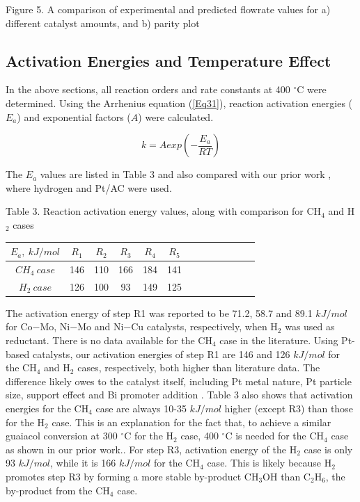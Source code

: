 \documentclass[journal=iecred,manuscript=article]{achemso}
\begin{document}
\begin{center}
\epsfxsize=500pt

Figure 5. A comparison of experimental and predicted flowrate values for a) different catalyst amounts, and b) parity plot
\end{center}

\subsection{Activation Energies and Temperature Effect}
In the above sections, all reaction orders and rate constants at 400 $^{\circ}$C were determined.
Using the Arrhenius equation (\ref{Eq31}), reaction activation energies ($E_a$) and exponential factors ($A$) were calculated.

\begin{equation} \label{Eq31}
k=Aexp\left(-\frac{E_a}{RT}\right)
\end{equation}

The $E_a$ values are listed in Table 3 and also compared with our prior work \cite{Gao2015},
where hydrogen and Pt/AC were used.

\begin{center}
Table 3. Reaction activation energy values, along with comparison for CH$_4$ and H$_2$ cases

\begin{tabular}{c c c c c c c c c c c c c}
\toprule
$E_a,~kJ/mol$ & $R_1$ & $R_2$ & $R_3$ & $R_4$ & $R_5$\\
\midrule
$CH_4~case$ & 146 & 110 & 166 & 184 & 141\\
$H_2~case$ & 126 & 100 & 93 & 149 & 125\\
\bottomrule
\end{tabular}
\end{center}

The activation energy of step R1 was reported to be 71.2, 58.7 and 89.1 $kJ/mol$
for Co$-$Mo, Ni$-$Mo and Ni$-$Cu catalysts, respectively, \cite{Laurent1994,Bykova2013}
when H$_2$ was used as reductant.
There is no data available for the CH$_4$ case in the literature.
Using Pt-based catalysts, 
our activation energies of step R1 are 146 and 126 $kJ/mol$ for the CH$_4$ and H$_2$ cases, respectively, both higher than literature data.
The difference likely owes to the catalyst itself,
including Pt metal nature, Pt particle size, support effect and Bi promoter addition \cite{Deepa2014, Xiao2015}.
Table 3 also shows that activation energies for the CH$_4$ case are always 10-35 $kJ/mol$ higher (except R3) than those for the H$_2$ case. 
This is an explanation for the fact that, to achieve a similar guaiacol conversion at 300 $^{\circ}$C for the H$_2$ case,
400 $^{\circ}$C is needed for the CH$_4$ case as shown in our prior work.\cite{Xiao2015}.
For step R3, activation energy of the H$_2$ case is only 93 $kJ/mol$,
while it is 166 $kJ/mol$ for the CH$_4$ case.
This is likely because H$_2$ promotes step R3 by forming a more stable by-product CH$_3$OH than C$_2$H$_6$, the by-product from the CH$_4$ case.
\end{document}
